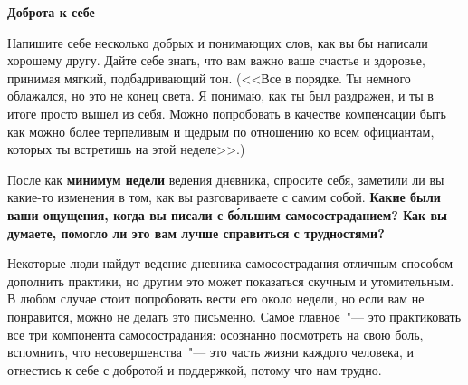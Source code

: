 \textbf{Доброта к себе}

Напишите себе несколько добрых и понимающих слов, как вы бы написали хорошему другу. Дайте себе знать, что вам важно ваше счастье и здоровье, принимая мягкий, подбадривающий тон. (<<Все в порядке. Ты немного облажался, но это не конец света. Я понимаю, как ты был раздражен, и ты в итоге просто вышел из себя. Можно попробовать в качестве компенсации быть как можно более терпеливым и щедрым по отношению ко всем официантам, которых ты встретишь на этой неделе>>.) 

\vspace{5ex}


\vspace{3ex}
После как \textbf{минимум недели} ведения дневника, спросите себя, заметили ли вы какие-то изменения в том, как вы разговариваете с самим собой. \textbf{Какие были ваши ощущения, когда вы писали с б\'{о}льшим самосостраданием? Как вы думаете, помогло ли это вам лучше справиться с трудностями?}

Некоторые люди найдут ведение дневника самосострадания отличным способом дополнить практики, но другим это может показаться скучным и утомительным. В любом случае стоит попробовать вести его около недели, но если вам не понравится, можно не делать это письменно. Самое главное~"--- это практиковать все три компонента самосострадания: осознанно посмотреть на свою боль, вспомнить, что несовершенства~"--- это часть жизни каждого человека, и отнестись к себе с добротой и поддержкой, потому что нам трудно.



